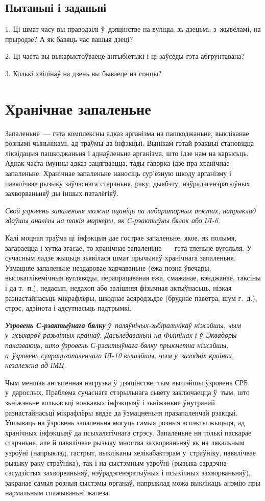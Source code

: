 \subsection*{Пытаньні і заданьні}

1. Ці шмат часу вы праводзілі ў~дзяцінстве на вуліцы, зь дзецьмі, з~жывёламі, на прыродзе? А як бавяць час вашыя дзеці?

2. Ці часта вы выкарыстоўваеце антыбіётыкі і ці заўсёды гэта абгрунтавана?

3. Колькі хвілінаў на дзень вы бываеце на сонцы?


\section{Хранічнае запаленьне}

Запаленьне~--- гэта комплексны адказ арганізма на пашкоджаньне, выкліканае рознымі чыньнікамі, ад траўмы да інфэкцыі. Вынікам гэтай рэакцыі становіцца ліквідацыя пашкоджаньня і аднаўленьне арганізма, што ідзе нам на карысьць. Аднак часта імунны адказ зацягваецца, тады гаворка ідзе пра хранічнае запаленьне. Хранічнае запаленьне наносіць сур'ёзную шкоду арганізму і павялічвае рызыку заўчаснага старэньня, раку, дыябэту, нэўрадэгенэратыўных захворваньняў ды іншых паталёгіяў.

\emph{Свой узровень запаленьня можна ацаніць па лабараторных тэстах, напрыклад здаўшы аналізы на такія маркеры, як С-рэактыўны бялок або ІЛ-6.}

Калі моцная траўма ці інфэкцыя дае гострае запаленьне, якое, як полымя, загараецца і хутка згасае, то хранічнае запаленьне~--- гэта тленьне вугольля. У сучасным ладзе жыцьця зьявілася шмат прычынаў хранічнага запаленьня. Узмацняе запаленьне нездаровае харчаваньне (ежа позна ўвечары, высокаглікемічныя вугляводы, перапрацаваная ежа, смажанае, вэнджанае, таксіны і да т.~п.), недасып, недахоп або залішняя фізычная актыўнасьць, нізкая разнастайнасьць мікрафлёры, шкоднае асяродзьдзе (бруднае паветра, шум г.~д.), стрэс, адзінота і адсутнасьць падтрымкі.

\emph{\textbf{Узровень С-рэактыўнага бялку} ў~паляўнічых-зьбіральнікаў ніжэйшы, чым у~жыхароў разьвітых краінаў. Дасьледаваньні на Філіпінах і ў~Эквадоры паказваюць, што ўзровень С-рэактыўнага бялку прыкметна ніжэйшы, а~ўзровень супрацьзапаленчага ІЛ-10 вышэйшы, чым у~заходніх краінах, незалежна ад ІМЦ.}

Чым меншая антыгенная нагрузка ў~дзяцінстве, тым вышэйшы ўзровень СРБ у~дарослых. Праблема сучаснага стэрыльнага сьвету заключаецца ў~тым, што зьніжэньне колькасьці вонкавых інфэкцыяў і зьніжэньне ўнутранай разнастайнасьці мікрафлёры вядзе да ўзмацненьня празапаленчай рэакцыі. Уплываць на ўзровень запаленьня могуць самыя розныя аспэкты жыцьця, ад хранічных інфэкцыяў да псыхалягічнага стрэсу. Запаленьне ня толькі паскарае старэньне, але й павялічвае рызыку мноства захворваньняў як на лякальным узроўні (напрыклад, гастрыт, выкліканы хелікабактэрам у~страўніку, павялічвае рызыку раку страўніка), так і на сыстэмным узроўні (рызыка сардэчна-сасудзістых захворваньняў, нэўрадэгенэратыўных і псыхічных захворваньняў), закранае самыя розныя сыстэмы органаў, напрыклад можа выклікаць анэмію пры нармальным спажываньні жалеза.

